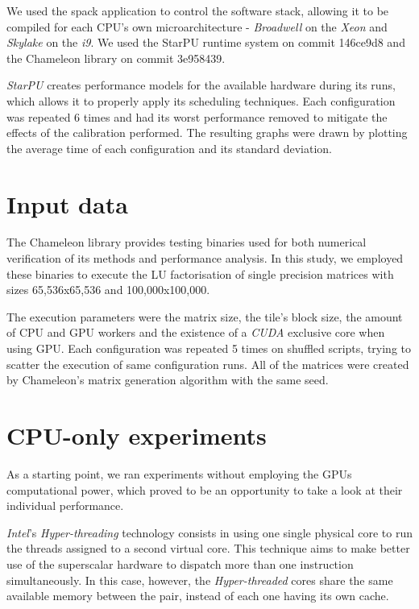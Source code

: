 \documentclass[ppgc,english]{iiufrgs}
\begin{document}
We used the spack \cite{spack} application to control the software stack, allowing it to be compiled
for each CPU's own microarchitecture - \emph{Broadwell} on the \emph{Xeon} and \emph{Skylake} on the \emph{i9}. We used the StarPU runtime
system on commit 146ce9d8 and the Chameleon library on commit 3e958439.

\emph{StarPU} creates performance models for the available hardware during its runs, which allows it to properly apply its scheduling techniques.
Each configuration was repeated 6 times and had its worst performance removed to mitigate the effects of the calibration performed.
The resulting graphs were drawn by plotting the average time of each configuration and its standard deviation.

\section{Input data}
\label{sec:org74a54f5}

The Chameleon library provides testing binaries used for both numerical verification of its methods and performance analysis. In this study,
we employed these binaries to execute the LU factorisation of single precision matrices with sizes 65,536x65,536 and 100,000x100,000.

The execution parameters were the matrix size, the tile's block size, the amount of CPU and GPU workers and the existence of a \emph{CUDA} exclusive
core when using GPU. Each configuration was repeated 5 times on shuffled scripts, trying to scatter the execution of same configuration runs.
All of the matrices were created by Chameleon's matrix generation algorithm with the same seed.

\section{CPU-only experiments}
\label{sec:orge779b40}

As a starting point, we ran experiments without employing the GPUs computational power, which proved to be an opportunity to take a look at
their individual performance.

\emph{Intel}'s \emph{Hyper-threading} technology consists in using one single physical core to run the threads assigned to a
second virtual core. This technique aims to make better use of the superscalar hardware to dispatch more than one instruction simultaneously.
In this case, however, the \emph{Hyper-threaded} cores share the same available memory between the pair, instead of each one having its own cache.
\end{document}
